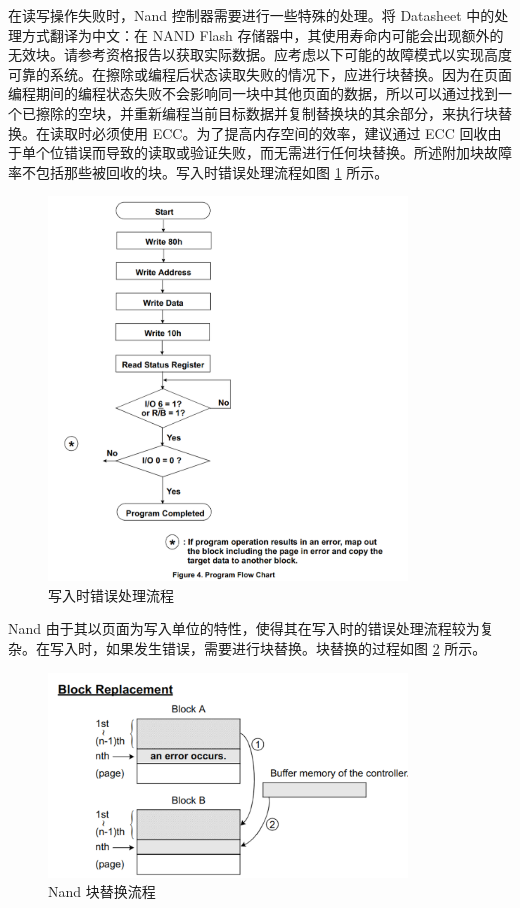 在读写操作失败时，Nand 控制器需要进行一些特殊的处理。将 Datasheet 中的处理方式翻译为中文：在 NAND Flash 存储器中，其使用寿命内可能会出现额外的无效块。请参考资格报告以获取实际数据。应考虑以下可能的故障模式以实现高度可靠的系统。在擦除或编程后状态读取失败的情况下，应进行块替换。因为在页面编程期间的编程状态失败不会影响同一块中其他页面的数据，所以可以通过找到一个已擦除的空块，并重新编程当前目标数据并复制替换块的其余部分，来执行块替换。在读取时必须使用 ECC。为了提高内存空间的效率，建议通过 ECC 回收由于单个位错误而导致的读取或验证失败，而无需进行任何块替换。所述附加块故障率不包括那些被回收的块。写入时错误处理流程如图 \ref{nand-rw-err} 所示。

\begin{figure}[htbp]
  \centering
  \includegraphics[width=0.85\textwidth]{fig/nand-rw-err}
  \caption{写入时错误处理流程}
  \label{nand-rw-err}
\end{figure}

Nand 由于其以页面为写入单位的特性，使得其在写入时的错误处理流程较为复杂。在写入时，如果发生错误，需要进行块替换。块替换的过程如图 \ref{nand-replace} 所示。

\begin{figure}[htbp]
  \centering
  \includegraphics[width=0.85\textwidth]{fig/nand-replace}
  \caption{Nand 块替换流程}
  \label{nand-replace}
\end{figure}

